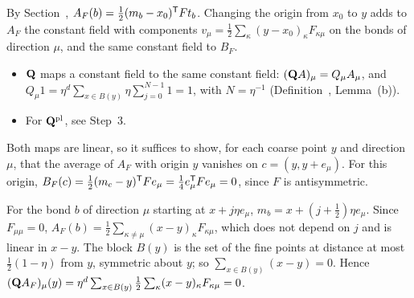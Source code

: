 \begin{step}
By Section~, $A_F(b)=\frac12(m_b-x_0)^{\sf T}Ft_b$. Changing the origin from $x_0$ to $y$ adds to $A_F$ the constant field with components $v_\mu=\frac12\sum_\kappa(y-x_0)_\kappa F_{\kappa\mu}$ on the bonds of direction $\mu$, and the same constant field to $B_F$.
\begin{itemize}
\item $\mathbf Q$ maps a constant field to the same constant field: $(\mathbf Q A)_\mu=Q_\mu A_\mu$, and $Q_\mu1=\eta^d\sum_{x\in B(y)}\eta\sum_{j=0}^{N-1}1=1$, with $N=\eta^{-1}$ (Definition~, Lemma~(b)).
\item For $\mathbf Q^{\rm pl}$, see Step~3.
\end{itemize}
Both maps are linear, so it suffices to show, for each coarse point $y$ and direction $\mu$, that the average of $A_F$ with origin $y$ vanishes on $c=(y,y+e_\mu)$. For this origin, $B_F(c)=\frac12(m_c-y)^{\sf T}Fe_\mu=\frac14e_\mu^{\sf T}Fe_\mu=0$, since $F$ is antisymmetric.
\end{step}

\begin{step}[(a)]
For the bond $b$ of direction $\mu$ starting at $x+j\eta e_\mu$, $m_b=x+(j+\frac12)\eta e_\mu$. Since $F_{\mu\mu}=0$, $A_F(b)=\frac12\sum_{\kappa\ne\mu}(x-y)_\kappa F_{\kappa\mu}$, which does not depend on $j$ and is linear in $x-y$. The block $B(y)$ is the set of the fine points at distance at most $\frac12(1-\eta)$ from $y$, symmetric about $y$; so $\sum_{x\in B(y)}(x-y)=0$. Hence $(\mathbf Q A_F)_\mu(y)=\eta^d\sum_{x\in B(y)}\frac12\sum_\kappa(x-y)_\kappa F_{\kappa\mu}=0$.
\end{step}

